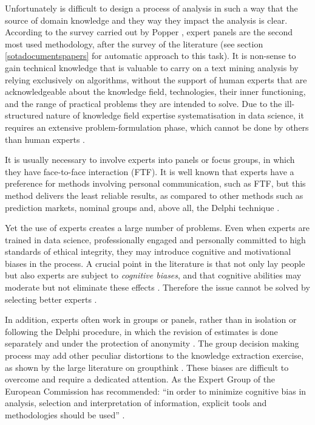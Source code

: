 \documentclass[]{book}
\theoremstyle{definition}
\theoremstyle{definition}
\theoremstyle{definition}
\theoremstyle{remark}
\begin{document}
Unfortunately is difficult to design a process of analysis in such a way
that the source of domain knowledge and they way they impact the
analysis is clear. According to the survey carried out by Popper
\citep{popper2008foresight}, expert panels are the second most used
methodology, after the survey of the literature (see section
\ref{sotadocumentspapers} for automatic approach to this task). It is
non-sense to gain technical knowledge that is valuable to carry on a
text mining analysis by relying exclusively on algorithms, without the
support of human experts that are acknowledgeable about the knowledge
field, technologies, their inner functioning, and the range of practical
problems they are intended to solve. Due to the ill-structured nature of
knowledge field expertise systematisation in data science, it requires
an extensive problem-formulation phase, which cannot be done by others
than human experts \citep{bracken2013making}.

It is usually necessary to involve experts into panels or focus groups,
in which they have face-to-face interaction (FTF). It is well known that
experts have a preference for methods involving personal communication,
such as FTF, but this method delivers the least reliable results, as
compared to other methods such as prediction markets, nominal groups
and, above all, the Delphi technique
\citep{woudenberg1991evaluation, graefe2011comparing}.

Yet the use of experts creates a large number of problems. Even when
experts are trained in data science, professionally engaged and
personally committed to high standards of ethical integrity, they may
introduce cognitive and motivational biases in the
process\citep{kahneman2011thinking}. A crucial point in the literature
is that not only lay people but also experts are subject to
\emph{cognitive biases}, and that cognitive abilities may moderate but
not eliminate these effects \citep{stanovich2008relative}. Therefore the
issue cannot be solved by selecting better experts
\citep{taleb2007black}.

In addition, experts often work in groups or panels, rather than in
isolation or following the Delphi procedure, in which the revision of
estimates is done separately and under the protection of anonymity
\citep{meijering2016effect, makkonen2016policy}. The group decision
making process may add other peculiar distortions to the knowledge
extraction exercise, as shown by the large literature on groupthink
\citep{janis1972victims, esser1998alive}. These biases are difficult to
overcome and require a dedicated attention. As the Expert Group of the
European Commission has recommended: ``in order to minimize cognitive
bias in analysis, selection and interpretation of information, explicit
tools and methodologies should be used'' \citep{tuomi2013next}.
\end{document}
